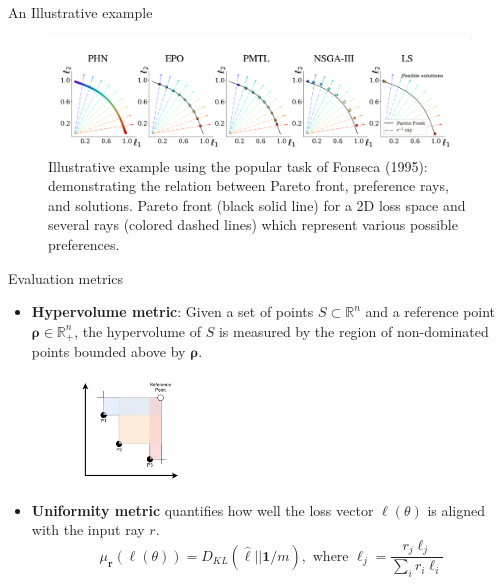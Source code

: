 \documentclass[13pt]{beamer}				\usepackage{graphicx}
\begin{document}
\begin{frame}{An Illustrative example}
\begin{figure}[h!]
    \includegraphics[width=1\textwidth, trim={0 0 0 0cm},clip]{images/pareto_example.png}
    \caption{Illustrative example using the popular task of Fonseca (1995): demonstrating the relation between Pareto front, preference rays, and solutions. Pareto front (black solid line) for a 2D loss space and several rays (colored dashed lines) which represent various possible preferences.}
\end{figure}
\end{frame}

\begin{frame}{Evaluation metrics}
\begin{itemize}
 \item \textbf{Hypervolume metric}: Given a set of points $S \subset \mathbb{R}^n$ and a reference point $\boldsymbol{\rho} \in \mathbb{R}^n_+$, the hypervolume of $S$ is measured by the region of non-dominated points bounded above by $\boldsymbol{\rho}$.
\begin{figure}[h!]
    \includegraphics[width=0.3\textwidth, trim={0 0 0 0cm},clip]{images/hypervol.png}
\end{figure}
\item \textbf{Uniformity metric} quantifies how well the loss vector $\boldsymbol{\ell}(\theta)$ is aligned with the input ray $r$.
$$\mu_{\mathbf{r}}(\boldsymbol{\ell}(\theta)) = D_{KL}(\hat{\boldsymbol{\ell}} || \mathbf{1} / m), \text{ where } \hat{\boldsymbol{\ell}}_j = \frac{r_j \ell_j}{\sum_i r_i \ell_i}$$
\end{itemize}
\end{frame}
\end{document}
